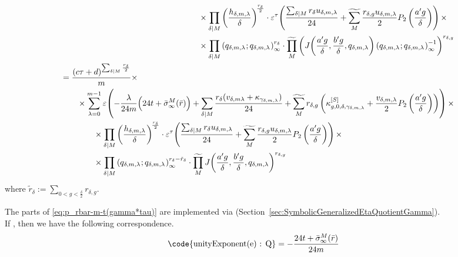 \documentclass{article}
\begin{document}
\begin{align}
\begin{split}
  & \qquad\qquad\times
    \divisorprod{M}
    \left(\frac{h_{\delta,m,\lambda}}{\delta}\right)^{\!\frac{r_\delta}{2}}
    \cdot
    \unityPowerTau{
    \frac{\divisorsum{M} r_\delta
        u_{\delta,m,\lambda}}{24}
      +
    \gensum[M]
    \frac{r_{\delta,g} u_{\delta,m,\lambda}}{2} P_2\left(\frac{a'
        g}{\delta}\right)
    }
  \times
  \\
  &\qquad\qquad
  \times
  \divisorprod{M}
  \eulerFunction[q_{\delta,m,\lambda}]{}^{r_\delta}
  \cdot
  \genprod[M]
  \left(
    \jacobiAlpha{\frac{a' g}{\delta}}{\frac{b' g}{\delta}}{q_{\delta,m,\lambda}}
    \eulerFunction[q_{\delta,m,\lambda}]{}^{-1}
  \right)^{r_{\delta,g}}
  \end{split}
  \notag\\
  \begin{split}
  &=
    \frac{(c\tau+d)^{\divisorsum{M} \frac{r_\delta}{2}}}{m}
  \times\\
  & \qquad\times
  \sum_{\lambda=0}^{m-1}
    \unityPower{-\frac{\lambda}{24m}\Bigl(24t+\sigmainftybar[M]{\bar{r}}\Bigr)
      + \divisorsum{M}\frac{r_\delta(v_{\delta,m\lambda}
        + \kappa_{\gamma_{\delta,m,\lambda}})}{24}
      +
      \gensum[M]
      r_{\delta,g}
      \left(
        \kappa_{g,0,\delta,\gamma_{\delta,m,\lambda}}^{[S]}
        +
        \frac{v_{\delta,m,\lambda}}{2} P_2\left(\frac{a' g}{\delta}\right)
      \right)}
  \times\\
  & \qquad\qquad\times
    \divisorprod{M}
    \left(\frac{h_{\delta,m,\lambda}}{\delta}\right)^{\!\frac{r_\delta}{2}}
    \cdot
    \unityPowerTau{
    \frac{\divisorsum{M} r_\delta
        u_{\delta,m,\lambda}}{24}
      +
    \gensum[M]
    \frac{r_{\delta,g} u_{\delta,m,\lambda}}{2} P_2\left(\frac{a'
        g}{\delta}\right)
    }
  \times
  \\
  &\qquad\qquad
  \times
  \divisorprod{M}
  \eulerFunction[q_{\delta,m,\lambda}]{}^{r_\delta - \tilde{r}_\delta}
  \cdot
  \genprod[M]
  \jacobiAlpha{\frac{a' g}{\delta}}
              {\frac{b' g}{\delta}}
              {q_{\delta,m,\lambda}}^{r_{\delta,g}}
  \end{split}
  \label{eq:p_rbar-m-t(gamma*tau)}
\end{align}
where
$\tilde{r}_\delta := \sum_{0 < g < \frac{\delta}{2}} r_{\delta,g}$.


The parts of \eqref{eq:p_rbar-m-t(gamma*tau)} are implemented via
\textcolor{blue}{}
(Section~\ref{sec:SymbolicGeneralizedEtaQuotientGamma}).
\\
If , then we have the
following correspondence.
\begin{align*}
  \text{\code{unityExponent(e) : Q}}
  &=
    -\frac{24t+\sigmainftybar[M]{\bar{r}}}{24m}
\end{align*}
\end{document}

